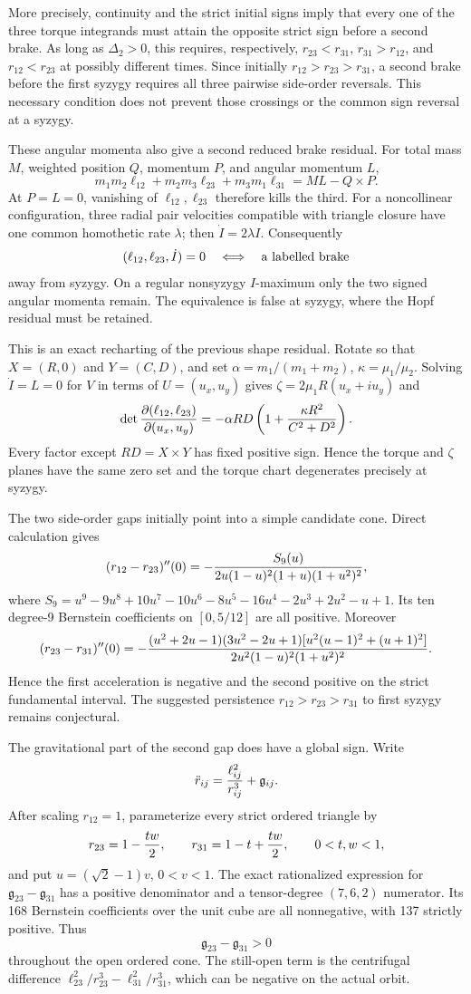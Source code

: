 \documentclass[11pt]{article}
\begin{document}
More precisely, continuity and the strict initial signs imply that every one
of the three torque integrands must attain the opposite strict sign before a
second brake.  As long as $\Delta_2>0$, this requires, respectively,
$r_{23}<r_{31}$, $r_{31}>r_{12}$, and $r_{12}<r_{23}$ at possibly different
times.  Since initially $r_{12}>r_{23}>r_{31}$, a second brake before the
first syzygy requires all three pairwise side-order reversals.  This necessary
condition does not prevent those crossings or the common sign reversal at a
syzygy.

These angular momenta also give a second reduced brake residual.  For total
mass $M$, weighted position $Q$, momentum $P$, and angular momentum $L$,
\[
m_1m_2\ell_{12}+m_2m_3\ell_{23}+m_3m_1\ell_{31}=ML-Q\times P.
\]
At $P=L=0$, vanishing of $\ell_{12},\ell_{23}$ therefore kills the third.
For a noncollinear configuration, three radial pair velocities compatible
with triangle closure have one common homothetic rate $\lambda$; then
$\dot I=2\lambda I$. Consequently
\[
(\ell_{12},\ell_{23},\dot I)=0
\quad\Longleftrightarrow\quad\hbox{a labelled brake}
\]
away from syzygy. On a regular nonsyzygy $I$-maximum only the two signed
angular momenta remain. The equivalence is false at syzygy, where the Hopf
residual must be retained.

This is an exact recharting of the previous shape residual. Rotate so that
$X=(R,0)$ and $Y=(C,D)$, and set
$\alpha=m_1/(m_1+m_2)$, $\kappa=\mu_1/\mu_2$. Solving
$\dot I=L=0$ for $V$ in terms of $U=(u_x,u_y)$ gives
$\zeta=2\mu_1R(u_x+iu_y)$ and
\[
\det {\partial(\ell_{12},\ell_{23})\over\partial(u_x,u_y)}
=-\alpha RD\left(1+{\kappa R^2\over C^2+D^2}\right).
\]
Every factor except $RD=X\times Y$ has fixed positive sign. Hence the torque
and $\zeta$ planes have the same zero set and the torque chart degenerates
precisely at syzygy.

The two side-order gaps initially point into a simple candidate cone. Direct
calculation gives
\[
(r_{12}-r_{23})''(0)=-{S_9(u)\over
2u(1-u)^2(1+u)(1+u^2)^2},
\]
where $S_9=u^9-9u^8+10u^7-10u^6-8u^5-16u^4-2u^3+2u^2-u+1$.
Its ten degree-9 Bernstein coefficients on $[0,5/12]$ are all positive.
Moreover
\[
(r_{23}-r_{31})''(0)=
-{(u^2+2u-1)(3u^2-2u+1)[u^2(u-1)^2+(u+1)^2]\over
2u^2(1-u)^2(1+u^2)^2}.
\]
Hence the first acceleration is negative and the second positive on the
strict fundamental interval. The suggested persistence
$r_{12}>r_{23}>r_{31}$ to first syzygy remains conjectural.

The gravitational part of the second gap does have a global sign. Write
\[
\ddot r_{ij}={\ell_{ij}^2\over r_{ij}^3}+\mathfrak g_{ij}.
\]
After scaling $r_{12}=1$, parameterize every strict ordered triangle by
\[
r_{23}=1-{tw\over2},\qquad r_{31}=1-t+{tw\over2},\qquad 0<t,w<1,
\]
and put $u=(\sqrt2-1)v$, $0<v<1$.  The exact rationalized expression for
$\mathfrak g_{23}-\mathfrak g_{31}$ has a positive denominator and a
tensor-degree $(7,6,2)$ numerator. Its 168 Bernstein coefficients over the
unit cube are all nonnegative, with 137 strictly positive. Thus
\[
\mathfrak g_{23}-\mathfrak g_{31}>0
\]
throughout the open ordered cone.  The still-open term is the centrifugal
difference $\ell_{23}^2/r_{23}^3-\ell_{31}^2/r_{31}^3$, which can be negative
on the actual orbit.
\end{document}
